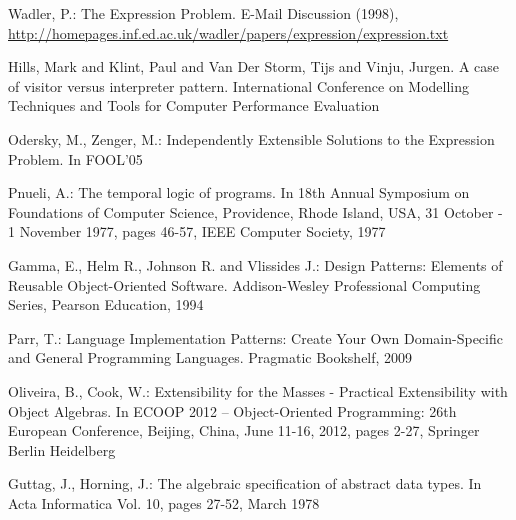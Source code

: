 \documentclass{llncs}
\begin{document}
%
%
\begin{thebibliography}{5}
%

Wadler, P.:
The Expression Problem.
E-Mail Discussion (1998),
\url{http://homepages.inf.ed.ac.uk/wadler/papers/expression/expression.txt}

Hills, Mark and Klint, Paul and Van Der Storm, Tijs and Vinju, Jurgen.
A case of visitor versus interpreter pattern.
International Conference on Modelling Techniques and Tools for Computer Performance Evaluation

Odersky, M., Zenger, M.:
Independently Extensible Solutions to the Expression Problem. 
In FOOL'05

Pnueli, A.:
The temporal logic of programs.
In 18th Annual Symposium on Foundations of Computer Science, Providence, Rhode Island, USA, 31 October - 1 November 1977, pages 46-57, IEEE Computer Society, 1977

Gamma, E., Helm R., Johnson R. and Vlissides J.:
Design Patterns: Elements of Reusable Object-Oriented Software.
Addison-Wesley Professional Computing Series, Pearson Education, 1994

Parr, T.:
Language Implementation Patterns: Create Your Own Domain-Specific and General Programming Languages.
Pragmatic Bookshelf, 2009

Oliveira, B., Cook, W.:
Extensibility for the Masses - Practical Extensibility with Object Algebras.
In ECOOP 2012 -- Object-Oriented Programming: 26th European Conference, Beijing, China, June 11-16, 2012, pages 2-27, Springer Berlin Heidelberg

Guttag, J., Horning, J.:
The algebraic specification of abstract data types.
In Acta Informatica Vol. 10, pages 27-52, March 1978

\end{thebibliography}
\end{document}
